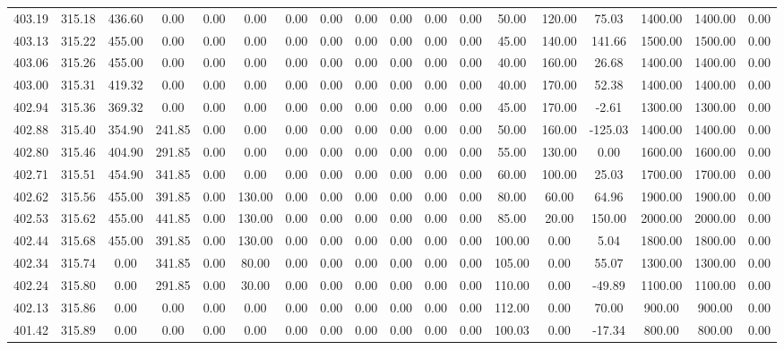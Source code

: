 \begin{table}[!ht]
{\begin{tabular}{cccccccccccccccccc}
403.19 & 315.18 & 436.60 & 0.00 & 0.00 & 0.00 & 0.00 & 0.00 & 0.00 & 0.00 & 0.00 & 0.00 & 50.00 & 120.00 & 75.03 & 1400.00 & 1400.00 & 0.00 \\
403.13 & 315.22 & 455.00 & 0.00 & 0.00 & 0.00 & 0.00 & 0.00 & 0.00 & 0.00 & 0.00 & 0.00 & 45.00 & 140.00 & 141.66 & 1500.00 & 1500.00 & 0.00 \\
403.06 & 315.26 & 455.00 & 0.00 & 0.00 & 0.00 & 0.00 & 0.00 & 0.00 & 0.00 & 0.00 & 0.00 & 40.00 & 160.00 & 26.68 & 1400.00 & 1400.00 & 0.00 \\
403.00 & 315.31 & 419.32 & 0.00 & 0.00 & 0.00 & 0.00 & 0.00 & 0.00 & 0.00 & 0.00 & 0.00 & 40.00 & 170.00 & 52.38 & 1400.00 & 1400.00 & 0.00 \\
402.94 & 315.36 & 369.32 & 0.00 & 0.00 & 0.00 & 0.00 & 0.00 & 0.00 & 0.00 & 0.00 & 0.00 & 45.00 & 170.00 & -2.61 & 1300.00 & 1300.00 & 0.00 \\
402.88 & 315.40 & 354.90 & 241.85 & 0.00 & 0.00 & 0.00 & 0.00 & 0.00 & 0.00 & 0.00 & 0.00 & 50.00 & 160.00 & -125.03 & 1400.00 & 1400.00 & 0.00 \\
402.80 & 315.46 & 404.90 & 291.85 & 0.00 & 0.00 & 0.00 & 0.00 & 0.00 & 0.00 & 0.00 & 0.00 & 55.00 & 130.00 & 0.00 & 1600.00 & 1600.00 & 0.00 \\
402.71 & 315.51 & 454.90 & 341.85 & 0.00 & 0.00 & 0.00 & 0.00 & 0.00 & 0.00 & 0.00 & 0.00 & 60.00 & 100.00 & 25.03 & 1700.00 & 1700.00 & 0.00 \\
402.62 & 315.56 & 455.00 & 391.85 & 0.00 & 130.00 & 0.00 & 0.00 & 0.00 & 0.00 & 0.00 & 0.00 & 80.00 & 60.00 & 64.96 & 1900.00 & 1900.00 & 0.00 \\
402.53 & 315.62 & 455.00 & 441.85 & 0.00 & 130.00 & 0.00 & 0.00 & 0.00 & 0.00 & 0.00 & 0.00 & 85.00 & 20.00 & 150.00 & 2000.00 & 2000.00 & 0.00 \\
402.44 & 315.68 & 455.00 & 391.85 & 0.00 & 130.00 & 0.00 & 0.00 & 0.00 & 0.00 & 0.00 & 0.00 & 100.00 & 0.00 & 5.04 & 1800.00 & 1800.00 & 0.00 \\
402.34 & 315.74 & 0.00 & 341.85 & 0.00 & 80.00 & 0.00 & 0.00 & 0.00 & 0.00 & 0.00 & 0.00 & 105.00 & 0.00 & 55.07 & 1300.00 & 1300.00 & 0.00 \\
402.24 & 315.80 & 0.00 & 291.85 & 0.00 & 30.00 & 0.00 & 0.00 & 0.00 & 0.00 & 0.00 & 0.00 & 110.00 & 0.00 & -49.89 & 1100.00 & 1100.00 & 0.00 \\
402.13 & 315.86 & 0.00 & 0.00 & 0.00 & 0.00 & 0.00 & 0.00 & 0.00 & 0.00 & 0.00 & 0.00 & 112.00 & 0.00 & 70.00 & 900.00 & 900.00 & 0.00 \\
401.42 & 315.89 & 0.00 & 0.00 & 0.00 & 0.00 & 0.00 & 0.00 & 0.00 & 0.00 & 0.00 & 0.00 & 100.03 & 0.00 & -17.34 & 800.00 & 800.00 & 0.00 \\
\bottomrule
\end{tabular}
}
\end{table}